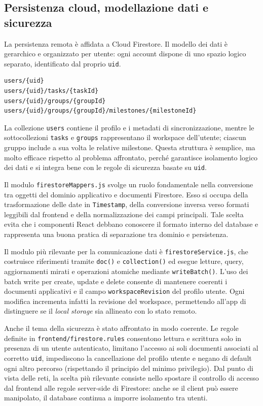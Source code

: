 \documentclass[11pt,a4paper]{article}
\begin{document}
\subsection{Persistenza cloud, modellazione dati e sicurezza}

\par La persistenza remota è affidata a Cloud Firestore. Il modello dei dati è gerarchico e organizzato per utente: ogni account dispone di uno spazio logico separato, identificato dal proprio \texttt{uid}.

\begin{lstlisting}
users/{uid}
users/{uid}/tasks/{taskId}
users/{uid}/groups/{groupId}
users/{uid}/groups/{groupId}/milestones/{milestoneId}
\end{lstlisting}

\par La collezione \texttt{users} contiene il profilo e i metadati di sincronizzazione, mentre le sottocollezioni \texttt{tasks} e \texttt{groups} rappresentano il workspace dell'utente; ciascun gruppo include a sua volta le relative milestone. Questa struttura è semplice, ma molto efficace rispetto al problema affrontato, perché garantisce isolamento logico dei dati e si integra bene con le regole di sicurezza basate su \texttt{uid}.

\par Il modulo \texttt{firestoreMappers.js} svolge un ruolo fondamentale nella conversione tra oggetti del dominio applicativo e documenti Firestore. Esso si occupa della trasformazione delle date in \texttt{Timestamp}, della conversione inversa verso formati leggibili dal frontend e della normalizzazione dei campi principali. Tale scelta evita che i componenti React debbano conoscere il formato interno del database e rappresenta una buona pratica di separazione tra dominio e persistenza.

\par Il modulo più rilevante per la comunicazione dati è \texttt{firestoreService.js}, che costruisce riferimenti tramite \texttt{doc()} e \texttt{collection()} ed esegue letture, query, aggiornamenti mirati e operazioni atomiche mediante \texttt{writeBatch()}. L'uso dei batch write per create, update e delete consente di mantenere coerenti i documenti applicativi e il campo \texttt{workspaceRevision} del profilo utente. Ogni modifica incrementa infatti la revisione del workspace, permettendo all'app di distinguere se il \textit{local storage} sia allineato con lo stato remoto.

\par Anche il tema della sicurezza è stato affrontato in modo coerente. Le regole definite in \texttt{frontend/firestore.rules} consentono lettura e scrittura solo in presenza di un utente autenticato, limitano l'accesso ai soli documenti associati al corretto \texttt{uid}, impediscono la cancellazione del profilo utente e negano di default ogni altro percorso (rispettando il principio del minimo privilegio). Dal punto di vista delle reti, la scelta più rilevante consiste nello spostare il controllo di accesso dal frontend alle regole server-side di Firestore: anche se il client può essere manipolato, il database continua a imporre isolamento tra utenti.
\end{document}
